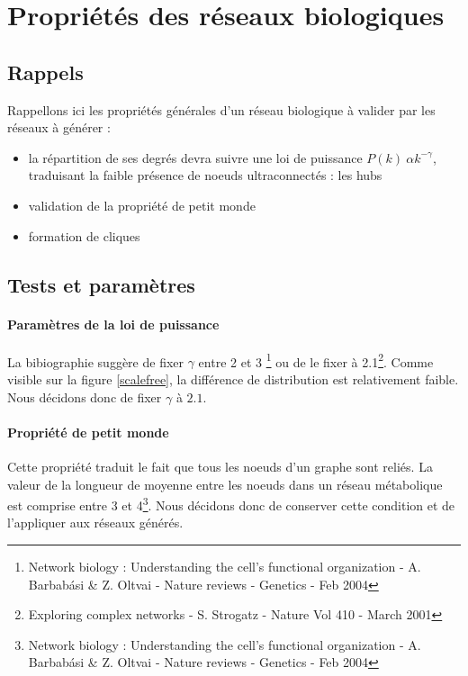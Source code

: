 \section{Propriétés des réseaux biologiques}

\subsection{Rappels}
Rappellons ici les propriétés générales d'un réseau biologique à valider par les réseaux à générer :
\begin{itemize}
	\item la répartition de ses degrés devra suivre une loi de puissance $ P(k) ~ \alpha k^{-\gamma} $, traduisant la faible présence de noeuds ultraconnectés : les hubs
	\item validation de la propriété de \og petit monde\fg
	\item formation de cliques 
\end{itemize}

\subsection{Tests et paramètres}
\paragraph*{Paramètres de la loi de puissance\\}
La bibiographie suggère de fixer $\gamma $ entre 2 et 3 \footnote{Network biology : Understanding the cell's functional organization - A. Barbab\'{a}si \& Z. Oltvai - Nature reviews - Genetics - Feb 2004} ou de le fixer à 2.1\footnote{Exploring complex networks - S. Strogatz - Nature Vol 410 - March 2001}. Comme visible sur la figure \ref{scalefree}, la différence de distribution est relativement faible. Nous décidons donc de fixer $\gamma$ à $2.1$.


\paragraph*{Propriété de petit monde \\}
Cette propriété traduit le fait que tous les noeuds d'un graphe sont reliés. La valeur de la longueur de moyenne entre les noeuds dans un réseau métabolique est comprise entre 3 et 4\footnote{Network biology : Understanding the cell's functional organization - A. Barbab\'{a}si \& Z. Oltvai - Nature reviews - Genetics - Feb 2004}. Nous décidons donc de conserver cette condition et de l'appliquer aux réseaux générés.

